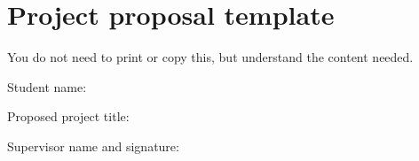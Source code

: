 \chapter{Project proposal template}

\begin{tcolorbox}
    You do not need to print or copy this, but understand the content needed.
\end{tcolorbox}

Student name: \TextField[width=9.75cm,name=Name]{}

Proposed project title: \TextField[width=8.5cm,name=Title]{}




Supervisor name and signature: \TextField[width=7cm,name=SuperNameAndSig]{}